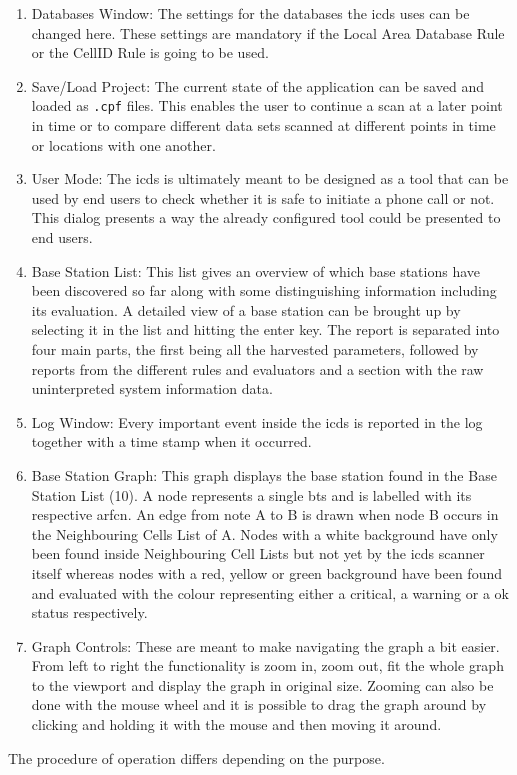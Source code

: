 \begin{enumerate}
\item Databases Window: The settings for the databases the \gls{icds} uses can be changed here.
These settings are mandatory if the Local Area Database Rule or the CellID Rule is going to be used.

\item Save/Load Project: The current state of the application can be saved and loaded as \texttt{.cpf} files.
This enables the user to continue a scan at a later point in time or to compare different data sets scanned at different points in time or locations with one another.

\item User Mode: The \gls{icds} is ultimately meant to be designed as a tool that can be used by end users to check whether it is safe to initiate a phone call or not.
This dialog presents a way the already configured tool could be presented to end users.

\item Base Station List: This list gives an overview of which base stations have been discovered so far along with some distinguishing information including its evaluation.
A detailed view of a base station can be brought up by selecting it in the list and hitting the enter key.
The report is separated into four main parts, the first being all the harvested parameters, followed by reports from the different rules and evaluators and a section with the raw uninterpreted system information data.
 
\item Log Window: Every important event inside the \gls{icds} is reported in the log together with a time stamp when it occurred.

\item Base Station Graph: This graph displays the base station found in the Base Station List (10).
A node represents a single \gls{bts} and is labelled with its respective \gls{arfcn}.
An edge from note A to B is drawn when node B occurs in the Neighbouring Cells List of A.
Nodes with a white background have only been found inside Neighbouring Cell Lists but not yet by the \gls{icds} scanner itself whereas nodes with a red, yellow or green background have been found and evaluated with the colour representing either a critical, a warning or a ok status respectively.

\item Graph Controls: These are meant to make navigating the graph a bit easier.
From left to right the functionality is zoom in, zoom out, fit the whole graph to the viewport and display the graph in original size.
Zooming can also be done with the mouse wheel and it is possible to drag the graph around by clicking and holding it with the mouse and then moving it around. 

\end{enumerate}
The procedure of operation differs depending on the purpose.
